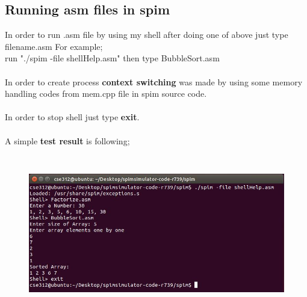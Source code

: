 \documentclass{article}
\begin{document}
\subsection{Running asm files in spim}
In order to run .asm file by using my shell after doing one of above just type filename.asm
For example;\\
run "./spim -file shellHelp.asm" then type BubbleSort.asm \\ \\
In order to create process \textbf{context switching} was made by using some memory handling codes from mem.cpp file in spim source code. \\ \\
In order to stop shell just type \textbf{exit}.\\ \\
A simple \textbf{test result} is following;
\begin{figure}[H]
    \centering
	\includegraphics[width=6in, height=2.7in]{res.JPG}
	\caption[Optional caption]{}
	\label{}
\end{figure}                              
\end{document}
